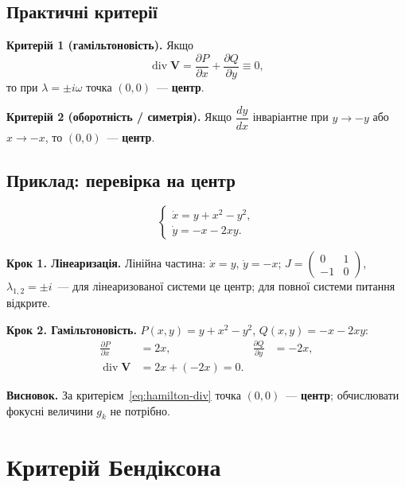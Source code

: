 \documentclass[12pt,a4paper]{article}
\begin{document}
\subsection{Практичні критерії}

\textbf{Критерій 1 (гамільтоновість).}
Якщо
\begin{equation}\label{eq:hamilton-div}
  \operatorname{div}\mathbf{V}
  =\frac{\partial P}{\partial x}+\frac{\partial Q}{\partial y}\equiv0,
\end{equation}
то при $\lambda=\pm i\omega$ точка $(0,0)$~--- \textbf{центр}.

\textbf{Критерій 2 (оборотність / симетрія).}
Якщо $\dfrac{dy}{dx}$ інваріантне при $y\to-y$ або $x\to-x$, то $(0,0)$~---
\textbf{центр}.

\subsection{Приклад: перевірка на центр}

\begin{equation}\label{eq:center-example}
\begin{cases}
  \dot{x} = y + x^2 - y^2,\\
  \dot{y} = -x - 2xy.
\end{cases}
\end{equation}

\textbf{Крок 1. Лінеаризація.}
Лінійна частина: $\dot{x}=y$, $\dot{y}=-x$;
$J=\begin{pmatrix}0&1\\-1&0\end{pmatrix}$,
$\lambda_{1,2}=\pm i$~--- для лінеаризованої системи це центр; для повної
системи питання відкрите.

\textbf{Крок 2. Гамільтоновість.}
$P(x,y)=y+x^2-y^2$, $Q(x,y)=-x-2xy$:
\begin{align*}
  \frac{\partial P}{\partial x} &= 2x, &
  \frac{\partial Q}{\partial y} &= -2x,\\
  \operatorname{div}\mathbf{V} &= 2x+(-2x)=0.
\end{align*}

\textbf{Висновок.} За критерієм~\eqref{eq:hamilton-div} точка $(0,0)$~---
\textbf{центр}; обчислювати фокусні величини $g_k$ не потрібно.

\section{Критерій Бендіксона}
\end{document}
